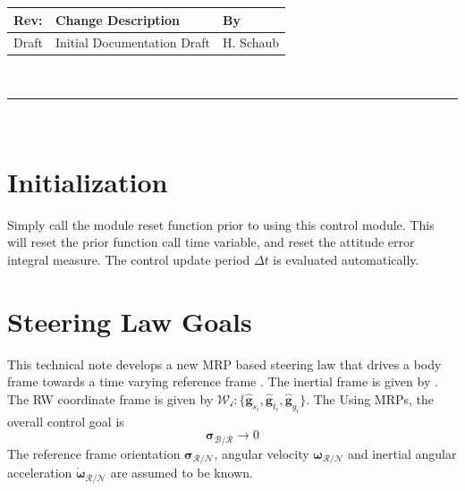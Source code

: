 \documentclass[]{AVSSimReportMemo}
\begin{document}
\makeCover


%
%
\pagestyle{empty}
{\renewcommand{\arraystretch}{2}
\noindent
\begin{longtable}{|p{0.5in}|p{4.5in}|p{1.14in}|}
\hline
{\bfseries Rev}: & {\bfseries Change Description} & {\bfseries By} \\
\hline
Draft & Initial Documentation Draft & H. Schaub \\
\hline

\end{longtable}
}

\newpage
\setcounter{page}{1}
\pagestyle{fancy}

\tableofcontents
~\\ \hrule ~\\



\section{Initialization}
Simply call the module reset function prior to using this control module.  This will reset the prior function call time variable, and reset the attitude error integral measure.  The control update period $\Delta t$ is evaluated automatically.  


\section{Steering Law Goals}
This technical note develops a new MRP based steering law that drives a body frame  towards a time varying reference frame . The inertial frame is given by .   The RW coordinate frame is given by $\mathcal{W_{i}}:\{ \hat{\bm g}_{s_{i}}, \hat{\bm g}_{t_{i}}, \hat{\bm g}_{g_{i}} \}$.  The   Using MRPs, the overall control goal is 
\begin{equation}
	\label{eq:MS:1}
	\bm\sigma_{\mathcal{B}/\mathcal{R}} \rightarrow 0
\end{equation}
The reference frame orientation $\bm \sigma_{\mathcal{R}/\mathcal{N}}$, angular velocity $\bm\omega_{\mathcal{R}/\mathcal{N}}$ and inertial angular acceleration $\dot{\bm \omega}_{\mathcal{R}/\mathcal{N}}$ are assumed to be known. 
\end{document}
